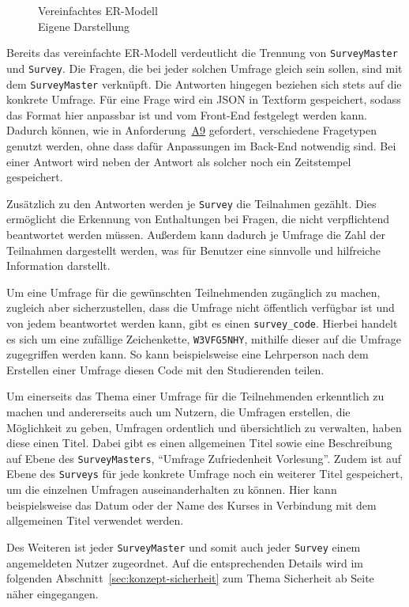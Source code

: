 \begin{figure}[ht]
	\centering
	\def\svgscale{0.72}
	\graphicspath{{img/backend/database/}}
	\scriptsize{}
	\captionsetup{format=plain, justification=centering}
	\caption[Vereinfachtes \acs{ER-Modell}]{Vereinfachtes \acs{ER-Modell}\\ \quelle Eigene Darstellung}
	\label{fig:er-model-simplified}
\end{figure}

Bereits das vereinfachte \acs{ER-Modell} verdeutlicht die Trennung von \texttt{SurveyMaster} und \texttt{Survey}.
Die Fragen, die bei jeder solchen Umfrage gleich sein sollen, sind mit dem \texttt{SurveyMaster} verknüpft.
Die Antworten hingegen beziehen sich stets auf die konkrete Umfrage.
Für eine Frage wird ein \acs{JSON} in Textform gespeichert, sodass das Format hier anpassbar ist und vom Front-End festgelegt werden kann.
Dadurch können, wie in Anforderung~\hyperref[Anf:A9]{A9} gefordert, verschiedene Fragetypen genutzt werden, ohne dass dafür Anpassungen im Back-End notwendig sind.
Bei einer Antwort wird neben der Antwort als solcher noch ein Zeitstempel gespeichert.

Zusätzlich zu den Antworten werden je \texttt{Survey} die Teilnahmen gezählt.
Dies ermöglicht die Erkennung von Enthaltungen bei Fragen, die nicht verpflichtend beantwortet werden müssen.
Außerdem kann dadurch je Umfrage die Zahl der Teilnahmen dargestellt werden, was für Benutzer eine sinnvolle und hilfreiche Information darstellt.

Um eine Umfrage für die gewünschten Teilnehmenden zugänglich zu machen, zugleich aber sicherzustellen, dass die Umfrage nicht öffentlich verfügbar ist und von jedem beantwortet werden kann, gibt es einen \texttt{survey\_code}.
Hierbei handelt es sich um eine zufällige Zeichenkette, \zb \texttt{W3VFG5NHY}, mithilfe dieser auf die Umfrage zugegriffen werden kann.
So kann beispielsweise eine Lehrperson nach dem Erstellen einer Umfrage diesen Code mit den Studierenden teilen.

Um einerseits das Thema einer Umfrage für die Teilnehmenden erkenntlich zu machen und andererseits auch um Nutzern, die Umfragen erstellen, die Möglichkeit zu geben, Umfragen ordentlich und übersichtlich zu verwalten, haben diese einen Titel.
Dabei gibt es einen allgemeinen Titel sowie eine Beschreibung auf Ebene des \texttt{SurveyMasters}, \zb \enquote{Umfrage Zufriedenheit Vorlesung}.
Zudem ist auf Ebene des \texttt{Surveys} für jede konkrete Umfrage noch ein weiterer Titel gespeichert, um die einzelnen Umfragen auseinanderhalten zu können.
Hier kann beispielsweise das Datum oder der Name des Kurses in Verbindung mit dem allgemeinen Titel verwendet werden.

Des Weiteren ist jeder \texttt{SurveyMaster} und somit auch jeder \texttt{Survey} einem angemeldeten Nutzer zugeordnet.
Auf die entsprechenden Details wird im folgenden Abschnitt~\ref{sec:konzept-sicherheit} zum Thema Sicherheit ab Seite~\pageref{sec:authentifizierung} näher eingegangen.
